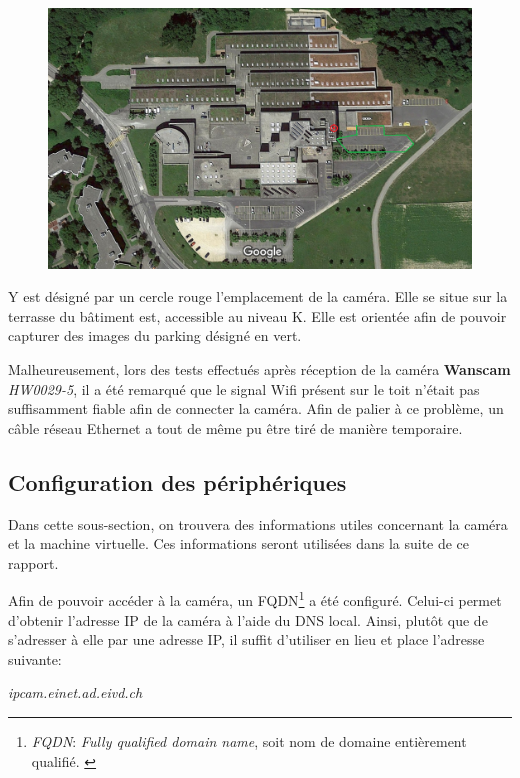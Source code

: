 \begin{figure}[H]
    \includegraphics[width=14cm]{img/conception/cam_parking_location.png}
    \centering
    \label{fig:cam_parking_annotation}
\end{figure} 

Y est désigné par un cercle rouge l'emplacement de la caméra. Elle se situe sur la terrasse du bâtiment est, accessible au niveau K. Elle est orientée afin de pouvoir capturer des images du parking désigné en vert. 

Malheureusement, lors des tests effectués après réception de la caméra \textbf{Wanscam} \textit{HW0029-5}, il a été remarqué que le signal Wifi présent sur le toit n'était pas suffisamment fiable afin de connecter la caméra. Afin de palier à ce problème, un câble réseau Ethernet a tout de même pu être tiré de manière temporaire.

\subsection{Configuration des périphériques}
Dans cette sous-section, on trouvera des informations utiles concernant la caméra et la machine virtuelle. Ces informations seront utilisées dans la suite de ce rapport. 

Afin de pouvoir accéder à la caméra, un FQDN\footnote{\textit{FQDN}: \textit{Fully qualified domain name}, soit nom de domaine entièrement qualifié. \autocite{wiki:FQDN}} a été configuré. Celui-ci permet d'obtenir l'adresse IP de la caméra à l'aide du DNS local. Ainsi, plutôt que de s'adresser à elle par une adresse IP, il suffit d'utiliser en lieu et place l'adresse suivante:
\begin{center}
    \textit{ipcam.einet.ad.eivd.ch}
\end{center}

